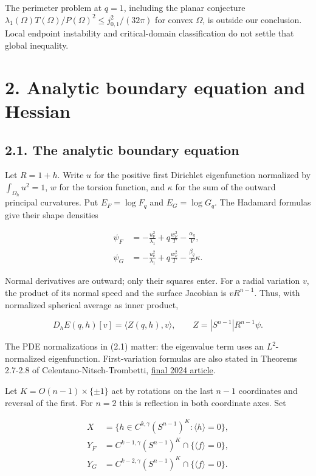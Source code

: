\documentclass[11pt]{article}
\begin{document}
The perimeter problem at \(q=1\), including the planar conjecture
\(\lambda_1(\Omega)T(\Omega)/P(\Omega)^2\le j_{0,1}^2/(32\pi)\) for
convex \(\Omega\), is outside our conclusion. Local endpoint instability
and critical-domain classification do not settle that global inequality.

\section{2. Analytic boundary equation and
Hessian}\label{analytic-boundary-equation-and-hessian}

\subsection{2.1. The analytic boundary
equation}\label{the-analytic-boundary-equation}

Let \(R=1+h\). Write \(u\) for the positive first Dirichlet
eigenfunction normalized by \(\int_{\Omega_h}u^2=1\), \(w\) for the
torsion function, and \(\kappa\) for the sum of the outward principal
curvatures. Put \(E_F=\log F_q\) and \(E_G=\log G_q\). The Hadamard
formulas give their shape densities

\[
\begin{aligned}
\psi_F&=-\frac{u_\nu^2}{\lambda_1}+q\frac{w_\nu^2}{T}-\frac{\alpha_q}{V},\\
\psi_G&=-\frac{u_\nu^2}{\lambda_1}+q\frac{w_\nu^2}{T}-\frac{\beta_q}{P}\kappa.
\end{aligned}
\tag{2.1}
\]

Normal derivatives are outward; only their squares enter. For a radial
variation \(v\), the product of its normal speed and the surface
Jacobian is \(vR^{n-1}\). Thus, with normalized spherical average as
inner product,

\[
D_hE(q,h)[v]=\langle Z(q,h),v\rangle,
\qquad Z=|S^{n-1}|R^{n-1}\psi.
\tag{2.2}
\]

The PDE normalizations in (2.1) matter: the eigenvalue term uses an
\(L^2\)-normalized eigenfunction. First-variation formulas are also
stated in Theorems 2.7-2.8 of Celentano-Nitsch-Trombetti,
\href{https://doi.org/10.1007/s00032-024-00405-9}{final 2024 article}.

Let \(K=O(n-1)\times\{\pm1\}\) act by rotations on the last \(n-1\)
coordinates and reversal of the first. For \(n=2\) this is reflection in
both coordinate axes. Set

\[
\begin{aligned}
X&=\{h\in C^{k,\gamma}(S^{n-1})^K:\langle h\rangle=0\},\\
Y_F&=C^{k-1,\gamma}(S^{n-1})^K\cap\{\langle f\rangle=0\},\\
Y_G&=C^{k-2,\gamma}(S^{n-1})^K\cap\{\langle f\rangle=0\}.
\end{aligned}
\tag{2.3}
\]
\end{document}
